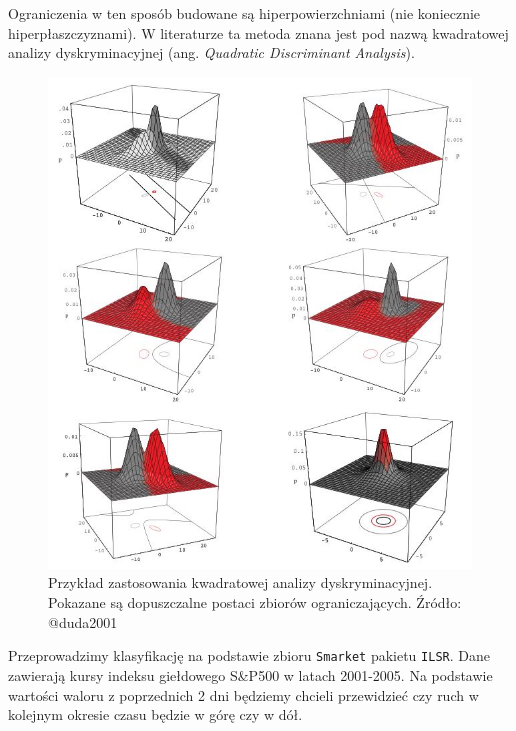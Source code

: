 \documentclass[
]{book}
\theoremstyle{plain}
\theoremstyle{definition}
\theoremstyle{definition}
\theoremstyle{definition}
\theoremstyle{definition}
\theoremstyle{remark}
\let\BeginKnitrBlock\begin \let\EndKnitrBlock\end
\begin{document}
Ograniczenia w ten sposób budowane są hiperpowierzchniami (nie koniecznie hiperpłaszczyznami). W literaturze ta metoda znana jest pod nazwą kwadratowej analizy dyskryminacyjnej (ang. \emph{Quadratic Discriminant Analysis}).

\begin{figure}

{\centering \includegraphics[width=6.35in]{images/dyskrym3} 

}

\caption{Przykład zastosowania kwadratowej analizy dyskryminacyjnej. Pokazane są dopuszczalne postaci zbiorów ograniczających. Źródło: @duda2001}\label{fig:hiper3}
\end{figure}

\BeginKnitrBlock{example}
\protect\hypertarget{exm:caravan}{}{\label{exm:caravan} }Przeprowadzimy klasyfikację na podstawie zbioru \texttt{Smarket} pakietu \texttt{ILSR}. Dane zawierają kursy indeksu giełdowego S\&P500 w latach 2001-2005. Na podstawie wartości waloru z poprzednich 2 dni będziemy chcieli przewidzieć czy ruch w kolejnym okresie czasu będzie w górę czy w dół.
\EndKnitrBlock{example}
\end{document}
